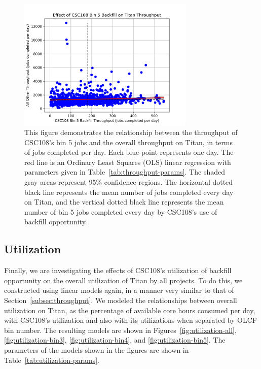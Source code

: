 \begin{figure}
  \includegraphics[width=0.75\textwidth]{images/linfit-throughput-bin5.png}
\caption{This figure demonstrates the relationship between the throughput of
CSC108's bin 5 jobs and the overall throughput on Titan, in terms of jobs
completed per day. Each blue point represents one day. The red line is an
Ordinary Least Squares (OLS) linear regression with parameters given in
Table~\ref{tab:throughput-params}. The shaded gray areas represent 95\%
confidence regions. The horizontal dotted black line represents the mean number
of jobs completed every day on Titan, and the vertical dotted black line
represents the mean number of bin 5 jobs completed every day by CSC108's use of
backfill opportunity.}
\label{fig:throughput-bin5}
\end{figure}


\subsection{Utilization}
\label{subsec:utilization}

Finally, we are investigating the effects of CSC108's utilization of backfill
opportunity on the overall utilization of Titan by all projects. To do this, we
constructed using linear models again, in a manner very similar to that of
Section~\ref{subsec:throughput}. We modeled the relationships between overall
utilization on Titan, as the percentage of available core hours consumed per
day, with CSC108's utilization and also with its utilizations when separated by
OLCF bin number. The resulting models are shown in
Figures~\ref{fig:utilization-all}, \ref{fig:utilization-bin3},
\ref{fig:utilization-bin4}, and \ref{fig:utilization-bin5}. The parameters of
the models shown in the figures are shown in
Table~\ref{tab:utilization-params}.

